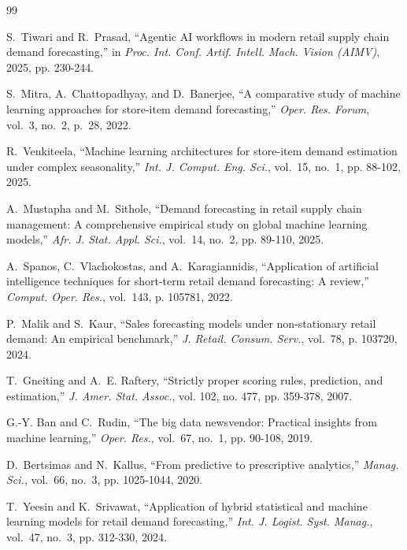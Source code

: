 \documentclass[11pt,a4paper]{article}
\begin{document}
\clearpage
\begin{thebibliography}{99}

S.~Tiwari and R.~Prasad, ``Agentic AI workflows in modern retail supply chain demand forecasting,'' in \emph{Proc. Int. Conf. Artif. Intell. Mach. Vision (AIMV)}, 2025, pp. 230-244.

S.~Mitra, A.~Chattopadhyay, and D.~Banerjee, ``A comparative study of machine learning approaches for store-item demand forecasting,'' \emph{Oper. Res. Forum}, vol.~3, no.~2, p.~28, 2022.

R.~Venkiteela, ``Machine learning architectures for store-item demand estimation under complex seasonality,'' \emph{Int. J. Comput. Eng. Sci.}, vol.~15, no.~1, pp. 88-102, 2025.

A.~Mustapha and M.~Sithole, ``Demand forecasting in retail supply chain management: A comprehensive empirical study on global machine learning models,'' \emph{Afr. J. Stat. Appl. Sci.}, vol.~14, no.~2, pp. 89-110, 2025.

A.~Spanos, C.~Vlachokostas, and A.~Karagiannidis, ``Application of artificial intelligence techniques for short-term retail demand forecasting: A review,'' \emph{Comput. Oper. Res.}, vol.~143, p. 105781, 2022.

P.~Malik and S.~Kaur, ``Sales forecasting models under non-stationary retail demand: An empirical benchmark,'' \emph{J. Retail. Consum. Serv.}, vol.~78, p. 103720, 2024.

T.~Gneiting and A.~E. Raftery, ``Strictly proper scoring rules, prediction, and estimation,'' \emph{J. Amer. Stat. Assoc.}, vol. 102, no. 477, pp. 359-378, 2007.

G.-Y. Ban and C.~Rudin, ``The big data newsvendor: Practical insights from machine learning,'' \emph{Oper. Res.}, vol.~67, no.~1, pp. 90-108, 2019.

D.~Bertsimas and N.~Kallus, ``From predictive to prescriptive analytics,'' \emph{Manag. Sci.}, vol.~66, no.~3, pp. 1025-1044, 2020.

T.~Yeesin and K.~Srivawat, ``Application of hybrid statistical and machine learning models for retail demand forecasting,'' \emph{Int. J. Logist. Syst. Manag.}, vol.~47, no.~3, pp. 312-330, 2024.


\end{thebibliography}
\end{document}
